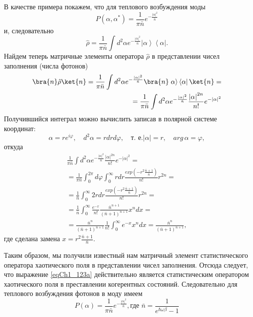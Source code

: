 В качестве примера покажем, что для теплового возбуждения моды 
\begin{equation}
P\left(\alpha, \alpha^{*}\right) = \frac{1}{\pi \bar{n}}
e^{- \frac{\left|\alpha\right|^2}{\bar{n}}}
\label{eqCh1_123a}
\end{equation}
и, следовательно
\[
\hat{\rho} = \frac{1}{\pi \bar{n}}
\int d^2 \alpha 
e^{- \frac{\left|\alpha\right|^2}{\bar{n}}}
\left|\alpha\right>
\left<\alpha\right|.
\]
Найдем теперь матричные элементы оператора $\hat{\rho}$ в
представлении чисел заполнения (числа фотонов)
\begin{eqnarray}
\bra{n}
\hat{\rho}
\ket{n} = 
\frac{1}{\pi \bar{n}}
\int d^2 \alpha 
e^{- \frac{\left|\alpha\right|^2}{\bar{n}}}
\bra{n}\left.\alpha\right>
\left<\alpha\right|
\ket{n} = 
\nonumber \\
= 
\frac{1}{\pi \bar{n}}
\int d^2 \alpha 
e^{- \frac{\left|\alpha\right|^2}{\bar{n}}}
\frac{\left|\alpha\right|^{2n}}{n!} 
e^{- \left|\alpha\right|^2} 
\nonumber 
\end{eqnarray}
Получившийся интеграл можно вычислить записав в полярной системе координат:
\[
\alpha = r e^{i \varphi}, \quad 
d^2 \alpha = r d r d \varphi , \quad 
\mbox{т. е.} 
\left|\alpha\right| = r, \quad arg\,\alpha = \varphi,
\]
откуда
\begin{eqnarray}
\frac{1}{\pi \bar{n}}
\int d^2 \alpha 
e^{- \frac{\left|\alpha\right|^2}{\bar{n}}}
\frac{\left|\alpha\right|^{2n}}{n!} 
e^{- \left|\alpha\right|^2} =
\nonumber \\
=
\frac{1}{\pi \bar{n}}
\int_0^{2 \pi} d \varphi 
\int_0^{\infty}
r dr \frac{exp \left(- r^2\frac{\bar{n} + 1}{\bar{n}}\right)}{n!} r^{2n}= 
\nonumber \\
= 
\frac{1}{\bar{n}}
\int_0^{\infty}
2 r dr \frac{exp \left(- r^2\frac{\bar{n} + 1}{\bar{n}}\right)}{n!}  r^{2n} = 
\nonumber \\
= 
\frac{1}{\bar{n}}
\int_0^{\infty}
\frac{e^{-x}}{n!}\frac{\bar{n}^{n + 1}}
{\left(\bar{n} + 1\right)^{n + 1}}x^n dx = 
\nonumber \\
=
\frac{\bar{n}^{n}}
{\left(\bar{n} + 1\right)^{n + 1}}
\frac{1}{n!}
\int_0^{\infty}
e^{-x}x^n dx = 
\frac{\bar{n}^{n}}
{\left(\bar{n} + 1\right)^{n + 1}},
\label{eqCh1_matrelemRho}
\end{eqnarray}
где сделана замена $x = r^2\frac{\bar{n} + 1}{\bar{n}}$.

Таким образом, мы получили известный нам матричный элемент
статистического оператора хаотического поля в представлении чисел
заполнения. Отсюда следует, что выражение \eqref{eqCh1_123a}
действительно является статистическим оператором хаотического поля в
преставлении когерентных состояний. Следовательно для теплового
возбуждения фотонов в моду имеем
\begin{equation}
P\left(\alpha\right) = \frac{1}{\pi \bar{n}}
e^{-\frac{\left|\alpha\right|^2}{\bar{n}}},
\mbox{где }
\bar{n} = \frac{1}{e^{\hbar \omega \beta} - 1}
\label{eqCh1_task4}
\end{equation}
  
